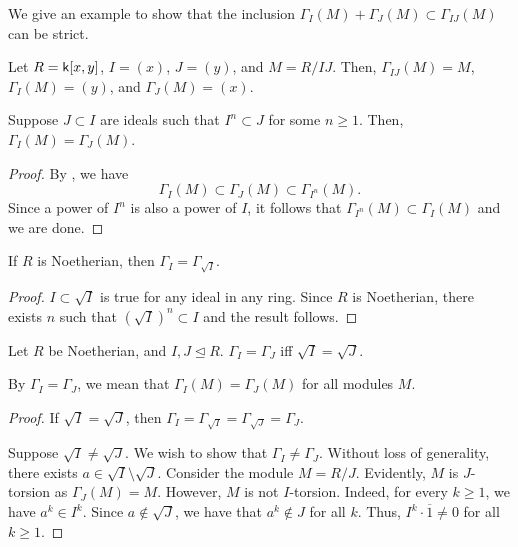 \begin{ex}
	We give an example to show that the inclusion $\Gamma_{I}(M) + \Gamma_{J}(M) \subset \Gamma_{IJ}(M)$ can be strict. 

	Let $R = \mathsf{k}[x, y]$, $I = (x)$, $J = (y)$, and $M = R/IJ$. Then, $\Gamma_{IJ}(M) = M$, $\Gamma_{I}(M) = (y)$, and $\Gamma_{J}(M) = (x)$.
\end{ex}

\begin{prop}
	Suppose $J \subset I$ are ideals such that $I^{n} \subset J$ for some $n \ge 1$. Then, $\Gamma_{I}(M) = \Gamma_{J}(M)$.
\end{prop}
\begin{proof} 
	By , we have
	\begin{equation*} 
		\Gamma_{I}(M) \subset \Gamma_{J}(M) \subset \Gamma_{I^{n}}(M).
	\end{equation*}
	Since a power of $I^{n}$ is also a power of $I$, it follows that $\Gamma_{I^{n}}(M) \subset \Gamma_{I}(M)$ and we are done.
\end{proof}

\begin{cor}
	If $R$ is Noetherian, then $\Gamma_{I} = \Gamma_{\sqrt{I}}$.
\end{cor}
\begin{proof} 
	$I \subset \sqrt{I}$ is true for any ideal in any ring. Since $R$ is Noetherian, there exists $n$ such that $(\sqrt{I})^{n} \subset I$ and the result follows.
\end{proof}

\begin{cor}
	Let $R$ be Noetherian, and $I, J \unlhd R$. $\Gamma_{I} = \Gamma_{J}$ iff $\sqrt{I} = \sqrt{J}$.
\end{cor}
By $\Gamma_{I} = \Gamma_{J}$, we mean that $\Gamma_{I}(M) = \Gamma_{J}(M)$ for all modules $M$.
\begin{proof} 
	\backward If $\sqrt{I} = \sqrt{J}$, then $\Gamma_{I} = \Gamma_{\sqrt{I}} = \Gamma_{\sqrt{J}} = \Gamma_{J}$.

	\forward Suppose $\sqrt{I} \neq \sqrt{J}$. We wish to show that $\Gamma_{I} \neq \Gamma_{J}$. Without loss of generality, there exists $a \in \sqrt{I} \setminus \sqrt{J}$. \newline
	Consider the module $M = R/J$. Evidently, $M$ is $J$-torsion as $\Gamma_{J}(M) = M$. However, $M$ is not $I$-torsion. Indeed, for every $k \ge 1$, we have $a^{k} \in I^{k}$. Since $a \notin \sqrt{J}$, we have that $a^{k} \notin J$ for all $k$. Thus, $I^{k} \cdot \overline{1} \neq 0$ for all $k \ge 1$.
\end{proof}

